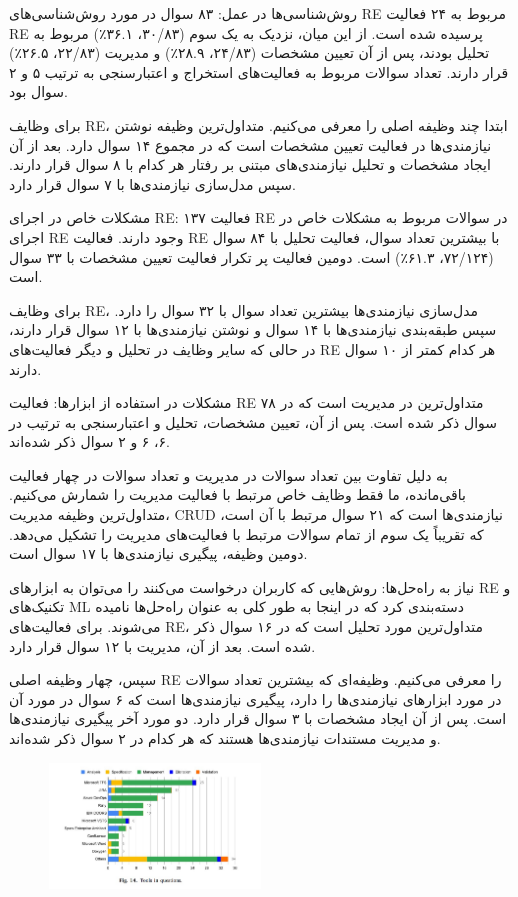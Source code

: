 \documentclass[a4paper,10pt]{article}
\begin{document}
            روش‌شناسی‌ها در عمل: ۸۳ سوال در مورد روش‌شناسی‌های RE مربوط به ۲۴ فعالیت RE پرسیده شده است. از این میان، نزدیک به یک سوم (۳۰/۸۳، ۳۶.۱٪) مربوط به تحلیل بودند، پس از آن تعیین مشخصات (۲۴/۸۳، ۲۸.۹٪) و مدیریت (۲۲/۸۳، ۲۶.۵٪) قرار دارند. تعداد سوالات مربوط به فعالیت‌های استخراج و اعتبارسنجی به ترتیب ۵ و ۲ سوال بود.

            برای وظایف RE، ابتدا چند وظیفه اصلی را معرفی می‌کنیم. متداول‌ترین وظیفه نوشتن نیازمندی‌ها در فعالیت تعیین مشخصات است که در مجموع ۱۴ سوال دارد. بعد از آن ایجاد مشخصات و تحلیل نیازمندی‌های مبتنی بر رفتار هر کدام با ۸ سوال قرار دارند. سپس مدل‌سازی نیازمندی‌ها با ۷ سوال قرار دارد.

            مشکلات خاص در اجرای RE: ۱۳۷ فعالیت RE در سوالات مربوط به مشکلات خاص در اجرای RE وجود دارند. فعالیت RE با بیشترین تعداد سوال، فعالیت تحلیل با ۸۴ سوال (۷۲/۱۲۴، ۶۱.۳٪) است. دومین فعالیت پر تکرار فعالیت تعیین مشخصات با ۳۳ سوال است.

            برای وظایف RE، مدل‌سازی نیازمندی‌ها بیشترین تعداد سوال با ۳۲ سوال را دارد. سپس طبقه‌بندی نیازمندی‌ها با ۱۴ سوال و نوشتن نیازمندی‌ها با ۱۲ سوال قرار دارند، در حالی که سایر وظایف در تحلیل و دیگر فعالیت‌های RE هر کدام کمتر از ۱۰ سوال دارند.

            مشکلات در استفاده از ابزارها: فعالیت RE متداول‌ترین در مدیریت است که در ۷۸ سوال ذکر شده است. پس از آن، تعیین مشخصات، تحلیل و اعتبارسنجی به ترتیب در ۶، ۶ و ۲ سوال ذکر شده‌اند.

            به دلیل تفاوت بین تعداد سوالات در مدیریت و تعداد سوالات در چهار فعالیت باقی‌مانده، ما فقط وظایف خاص مرتبط با فعالیت مدیریت را شمارش می‌کنیم. متداول‌ترین وظیفه مدیریت، CRUD نیازمندی‌ها است که ۲۱ سوال مرتبط با آن است، که تقریباً یک سوم از تمام سوالات مرتبط با فعالیت‌های مدیریت را تشکیل می‌دهد. دومین وظیفه، پیگیری نیازمندی‌ها با ۱۷ سوال است.

            نیاز به راه‌حل‌ها: روش‌هایی که کاربران درخواست می‌کنند را می‌توان به ابزارهای RE و تکنیک‌های ML دسته‌بندی کرد که در اینجا به طور کلی به عنوان راه‌حل‌ها نامیده می‌شوند. برای فعالیت‌های RE، متداول‌ترین مورد تحلیل است که در ۱۶ سوال ذکر شده است. بعد از آن، مدیریت با ۱۲ سوال قرار دارد.

            سپس، چهار وظیفه اصلی RE را معرفی می‌کنیم. وظیفه‌ای که بیشترین تعداد سوالات در مورد ابزارهای نیازمندی‌ها را دارد، پیگیری نیازمندی‌ها است که ۶ سوال در مورد آن است. پس از آن ایجاد مشخصات با ۳ سوال قرار دارد. دو مورد آخر پیگیری نیازمندی‌ها و مدیریت مستندات نیازمندی‌ها هستند که هر کدام در ۲ سوال ذکر شده‌اند.

            \begin{figure}
                \centering
                \includegraphics[width=0.5\textwidth]{Image/fig-14.jpg}
            \end{figure}
\end{document}
